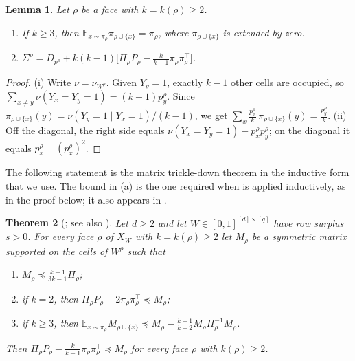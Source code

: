 \documentclass{amsart}
\numberwithin{equation}{section}
\theoremstyle{plain}
\newtheorem{theorem}{Theorem}[section]
\newtheorem{lemma}[theorem]{Lemma}
\theoremstyle{definition}
\theoremstyle{remark}
\newcommand{\E}{\mathbb{E}}
\newcommand{\T}{\top}
\begin{document}
\begin{lemma}\label{lem:link-identities}
Let $\rho$ be a face with $k=k(\rho)\ge2$.
\begin{enumerate}
\item[(i)] If $k\ge3$, then $\E_{x\sim\pi_\rho}\pi_{\rho\cup\{x\}}=\pi_\rho$, where $\pi_{\rho\cup\{x\}}$ is extended by zero.
\item[(ii)] $\Sigma^\rho=D_{p^\rho}+k(k-1)\bigl[\Pi_\rho P_\rho-\tfrac{k}{k-1}\pi_\rho\pi_\rho^\T\bigr]$.
\end{enumerate}
\end{lemma}

\begin{proof}
(i) Write $\nu=\nu_{W^\rho}$. Given $Y_y=1$, exactly $k-1$ other cells are occupied, so $\sum_{x\ne y}\nu(Y_x=Y_y=1)=(k-1)p^\rho_y$. Since $\pi_{\rho\cup\{x\}}(y)=\nu(Y_y=1\mid Y_x=1)/(k-1)$, we get $\sum_x\frac{p^\rho_x}{k}\,\pi_{\rho\cup\{x\}}(y)=\frac{p^\rho_y}{k}$. (ii) Off the diagonal, the right side equals $\nu(Y_x=Y_y=1)-p^\rho_xp^\rho_y$; on the diagonal it equals $p^\rho_x-(p^\rho_x)^2$.
\end{proof}

The following statement is the matrix trickle-down theorem in the inductive form that we use. The bound in (a) is the one required when \cite[Theorem~3.2]{ALG} is applied inductively, as in the proof below; it also appears in \cite[Theorem~3.4]{ALG}.

\begin{theorem}[{\cite[Theorem~3.2]{ALG}; see also \cite[Proposition~49]{CWZZ}}]\label{thm:trickle}
Let $d\ge2$ and let $W\in[0,1]^{[d]\times[q]}$ have row surplus $s>0$. For every face $\rho$ of $X_W$ with $k=k(\rho)\ge2$ let $M_\rho$ be a symmetric matrix supported on the cells of $W^\rho$ such that
\begin{enumerate}
\item[(a)] $M_\rho\preceq\frac{k-1}{3k-1}\Pi_\rho$;
\item[(b)] if $k=2$, then $\Pi_\rho P_\rho-2\pi_\rho\pi_\rho^\T\preceq M_\rho$;
\item[(c)] if $k\ge3$, then $\E_{x\sim\pi_\rho}M_{\rho\cup\{x\}}\preceq M_\rho-\frac{k-1}{k-2}M_\rho\Pi_\rho^{-1}M_\rho$.
\end{enumerate}
Then $\Pi_\rho P_\rho-\frac{k}{k-1}\pi_\rho\pi_\rho^\T\preceq M_\rho$ for every face $\rho$ with $k(\rho)\ge2$.
\end{theorem}
\end{document}

